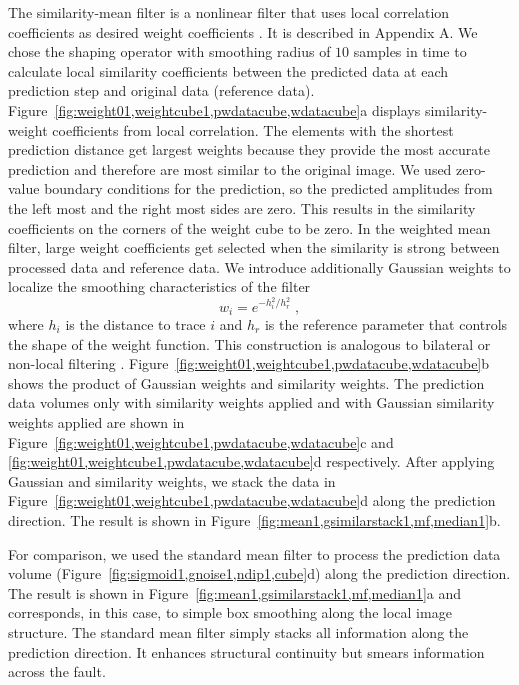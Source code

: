 The similarity-mean filter is a nonlinear filter that uses local
correlation coefficients as desired weight coefficients
\cite[]{Liu09b}. It is described in Appendix A. We chose 
the shaping operator with smoothing radius of $10$ samples in time to
calculate local similarity coefficients between the predicted data at
each prediction step and original data (reference
data). Figure~\ref{fig:weight01,weightcube1,pwdatacube,wdatacube}a
displays similarity-weight coefficients from local correlation. The
elements with the shortest prediction distance get largest weights
because they provide the most accurate prediction and therefore are
most similar to the original image. We used zero-value boundary
conditions for the prediction, so the predicted amplitudes from the
left most and the right most sides are zero. This results in the
similarity coefficients on the corners of the weight cube to be
zero. In the weighted mean filter, large weight coefficients get
selected when the similarity is strong between processed data and
reference data. We introduce additionally Gaussian weights to localize
the smoothing characteristics of the filter
\begin{equation}
  \label{eq:ismf}
    w_i = e^{-h_i^2/{h_r^2}}\;,
\end{equation}
where $h_i$ is the distance to trace $i$ and $h_r$ is the reference
parameter that controls the shape of the weight function. This
construction is analogous to bilateral or non-local filtering
\cite[]{Tomasi98,Gilboa08}. Figure~\ref{fig:weight01,weightcube1,pwdatacube,wdatacube}b
shows the product of Gaussian weights and similarity weights. The
prediction data volumes only with similarity weights applied and with
Gaussian similarity weights applied are shown in
Figure~\ref{fig:weight01,weightcube1,pwdatacube,wdatacube}c and
\ref{fig:weight01,weightcube1,pwdatacube,wdatacube}d respectively. 
After applying Gaussian and similarity weights, we stack the data in
Figure~\ref{fig:weight01,weightcube1,pwdatacube,wdatacube}d along the
prediction direction. The result is shown in
Figure~\ref{fig:mean1,gsimilarstack1,mf,median1}b.


For comparison, we used the standard mean filter to process the
prediction data volume (Figure~\ref{fig:sigmoid1,gnoise1,ndip1,cube}d)
along the prediction direction. The result is shown in
Figure~\ref{fig:mean1,gsimilarstack1,mf,median1}a and corresponds, in
this case, to simple box smoothing along the local image
structure. The standard mean filter simply stacks all information
along the prediction direction. It enhances structural
continuity but smears information across the fault.

